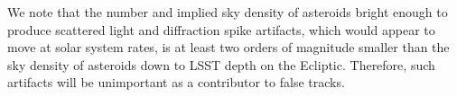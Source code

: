We note that the number and implied sky density of asteroids bright enough to produce
scattered light and diffraction spike artifacts, which would appear to move at solar system
rates, is at least two orders of magnitude smaller than the sky density of asteroids down
to LSST depth on the Ecliptic. Therefore, such artifacts will be unimportant as a contributor
to false tracks.
